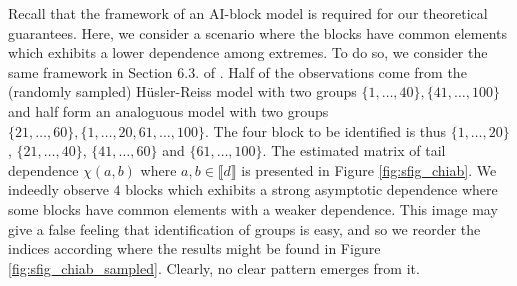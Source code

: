 \documentclass[11pt]{article}
\begin{document}
		Recall that the framework of an AI-block model is required for our theoretical guarantees. Here, we consider a scenario where the blocks have common elements which exhibits a lower dependence among extremes. To do so, we consider the same framework in Section 6.3. of \cite{fomichov2022spherical}. Half of the observations come from the (randomly sampled) Hüsler-Reiss model with two groups $\{1,\dots,40\}, \{41,\dots, 100\}$ and half form an analoguous model with two groups $\{21,\dots,60\}, \{1,\dots,20,61,\dots,100\}$. The four block to be identified is thus $\{1,\dots,20\}$, $\{21,\dots,40\}$, $\{41,\dots,60\}$ and $\{61,\dots,100\}$. The estimated matrix of tail dependence $\chi(a,b)$ where $a,b \in \llbracket d \rrbracket$ is presented in Figure \ref{fig:sfig_chiab}. We indeedly observe $4$ blocks which exhibits a strong asymptotic dependence where some blocks have common elements with a weaker dependence. This image may give a false feeling that identification of groups is easy, and so we reorder the indices according where the results might be found in Figure \ref{fig:sfig_chiab_sampled}. Clearly, no clear pattern emerges from it.
\end{document}
